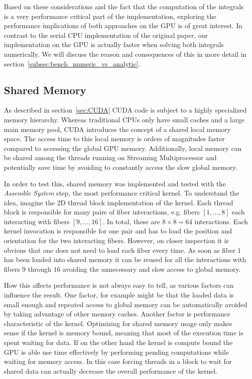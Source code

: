Based on these considerations and the fact that the computation of the integrals is a very performance critical part of the implementation, exploring the performance implications of both approaches on the GPU is of great interest. In contrast to the serial CPU implementation of the original paper, our implementation on the GPU is actually faster when solving both integrals numerically. We will discuss the reason and consequences of this in more detail in section~\ref{subsec:bench_numeric_vs_analytic}.

\subsection{Shared Memory}
\label{subsec:shared_memory}

As described in section~\ref{sec:CUDA} CUDA code is subject to a highly specialized memory hierarchy. Whereas traditional CPUs only have small caches and a large main memory pool, CUDA introduces the concept of a shared local memory space. The access time to this local memory is orders of magnitudes faster compared to accessing the global GPU memory. Additionally, local memory can be shared among the threads running on Streaming Multiprocessor and potentially save time by avoiding to constantly access the slow global memory.

In order to test this, shared memory was implemented and tested with the \emph{Assemble System} step, the most performance critical kernel. To understand the idea, imagine the 2D thread block implementation of the kernel. Each thread block is responsible for many pairs of fiber interactions, e.g. fibers $[1,\dots,8]$ each interacting with fibers $[9,\dots,16]$. In total, these are $8 \times 8 = 64$ interactions. Each kernel invocation is responsible for one pair and has to load the position and orientation for the two interacting fibers. However, on closer inspection it is obvious that one does not need to load each fiber every time. As soon as fiber $1$ has been loaded into shared memory it can be reused for all the interactions with fibers $9$ through $16$ avoiding the unnecessary and slow access to global memory.

How this affects performance is not always easy to tell, as various factors can influence the result. One factor, for example might be that the loaded data is small enough and repeated access to global memory can be automatically avoided by taking advantage of other memory caches. Another factor is performance characteristic of the kernel. Optimizing for shared memory usage only makes sense if the kernel is memory bound, meaning that most of the execution time is spent waiting for data. If on the other hand the kernel is compute bound the GPU is able use time effectively by performing pending computations while waiting for memory access. In this case forcing threads in a block to wait for shared data can actually decrease the overall performance of the kernel.

